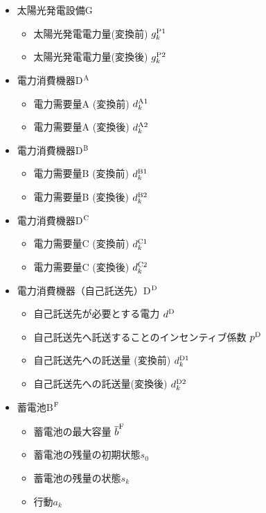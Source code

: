 \begin{itemize}
 	\item[\IS] 太陽光発電設備G
		\begin{itemize}
		 	\item[\IB] 太陽光発電電力量(変換前) $g^{\rm P1}_{k}$
  			\item[\IC] 太陽光発電電力量(変換後) $g^{\rm P2}_{k}$
		\end{itemize}	
	 \item[\IS] 電力消費機器D$^{\rm A}$
	 	\begin{itemize}
		 	\item[\IC] 電力需要量A (変換前) $d^{\rm A1}_{k}$
 			\item[\IB] 電力需要量A (変換後) $d^{\rm A2}_{k}$
		\end{itemize}
 	\item[\IS] 電力消費機器D$^{\rm B}$
	 	\begin{itemize}
		 	\item[\IC] 電力需要量B (変換前) $d^{\rm B1}_{k}$
 			\item[\IB] 電力需要量B (変換後) $d^{\rm B2}_{k}$
		\end{itemize}	
 	\item[\IS] 電力消費機器D$^{\rm C}$
	 	\begin{itemize}
		 	\item[\IC] 電力需要量C (変換前) $d^{\rm C1}_{k}$
 			\item[\IB] 電力需要量C (変換後) $d^{\rm C2}_{k}$
		\end{itemize}
 	\item[\IS] 電力消費機器（自己託送先）D$^{\rm D}$
 	\begin{itemize}
   		\item[\IB] 自己託送先が必要とする電力 $d^{\rm D}$
   		\item[\IB] 自己託送先へ託送することのインセンティブ係数 $p^{\rm D}$   
		\item[\IC] 自己託送先への託送量 (変換前) $d^{\rm D1}_{k}$
 		\item[\IC] 自己託送先への託送量(変換後) $d^{\rm D2}_{k}$
  	\end{itemize} 
 	\item[\IS] 蓄電池B$^{\rm F}$
  		\begin{itemize}
   			\item[\IB] 蓄電池の最大容量 $\overline{b}^{\rm F}$
			\item[\IB] 蓄電池の残量の初期状態$s_{0}$
			\item[\IC] 蓄電池の残量の状態$s_{k}$
			\item[\IC] 行動$a_{k}$

\end{itemize}
\end{itemize}
